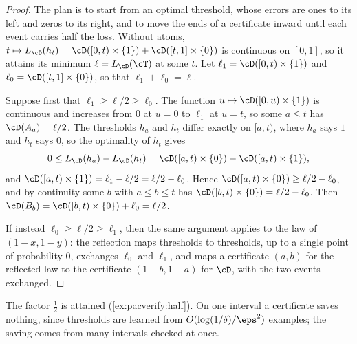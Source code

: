 \begin{refsection}

\begin{proof}
The plan is to start from an optimal threshold, whose errors are ones to its left and zeros to its right, and to move the ends of a certificate inward until each event carries half the loss. Without atoms, $t\mapsto L_\cD(h_t)=\cD([0,t)\times\{1\})+\cD([t,1]\times\{0\})$ is continuous on $[0,1]$, so it attains its minimum $\ell=L_\cD(\cT)$ at some $t$. Let $\ell_1=\cD([0,t)\times\{1\})$ and $\ell_0=\cD([t,1]\times\{0\})$, so that $\ell_1+\ell_0=\ell$.

Suppose first that $\ell_1\ge\ell/2\ge\ell_0$. The function $u\mapsto\cD([0,u)\times\{1\})$ is continuous and increases from $0$ at $u=0$ to $\ell_1$ at $u=t$, so some $a\le t$ has $\cD(A_a)=\ell/2$. The thresholds $h_a$ and $h_t$ differ exactly on $[a,t)$, where $h_a$ says $1$ and $h_t$ says $0$, so the optimality of $h_t$ gives
\[0\le L_\cD(h_a)-L_\cD(h_t)=\cD([a,t)\times\{0\})-\cD([a,t)\times\{1\}),\]
and $\cD([a,t)\times\{1\})=\ell_1-\ell/2=\ell/2-\ell_0$. Hence $\cD([a,t)\times\{0\})\ge\ell/2-\ell_0$, and by continuity some $b$ with $a\le b\le t$ has $\cD([b,t)\times\{0\})=\ell/2-\ell_0$. Then $\cD(B_b)=\cD([b,t)\times\{0\})+\ell_0=\ell/2$.

If instead $\ell_0\ge\ell/2\ge\ell_1$, then the same argument applies to the law of $(1-x,1-y)$: the reflection maps thresholds to thresholds, up to a single point of probability $0$, exchanges $\ell_0$ and $\ell_1$, and maps a certificate $(a,b)$ for the reflected law to the certificate $(1-b,1-a)$ for $\cD$, with the two events exchanged.
\end{proof}

The factor $\frac12$ is attained (\cref{ex:pacverify:half}). On one interval a certificate saves nothing, since thresholds are learned from $O(\log(1/\delta)/\eps^2)$ examples; the saving comes from many intervals checked at once.


\end{refsection}

